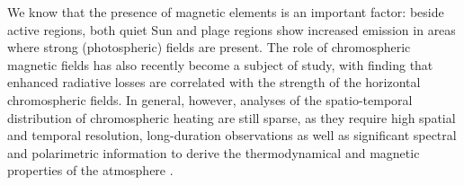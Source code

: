 \documentclass{iau}
\begin{document}
We know that the presence of magnetic elements is an important factor: beside active regions, both quiet Sun and plage regions show increased emission 
in areas where strong (photospheric) fields are present. The role of chromospheric magnetic fields has also recently become a subject of study, with \citet{2018A&A...612A..28L} finding that enhanced radiative losses are correlated with the strength of the horizontal chromospheric fields. In general, however, analyses of the spatio-temporal distribution of chromospheric heating are still sparse, as they require high spatial and temporal resolution, long-duration observations
as well as significant spectral and polarimetric information to derive the thermodynamical and magnetic properties of the atmosphere \citep[see e.g. the recent study by][]{2022A&A...664A...8M}. 

\end{document}
